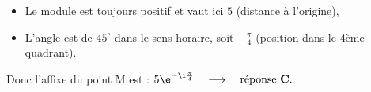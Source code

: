 \medskip

\begin{itemize}[label=\textbullet]
\item Le module est toujours positif et vaut ici $5$ (distance à l'origine),
\item L'angle est de $45^\circ$ dans le sens horaire, soit $-\frac{\pi}{4}$ (position dans le 4ème quadrant).
\end{itemize}

Donc l'affixe du point M est :
$5\e^{-\i\frac{\pi}{4}} \quad \longrightarrow \quad \text{réponse \textbf{C}.}$

\bigskip
